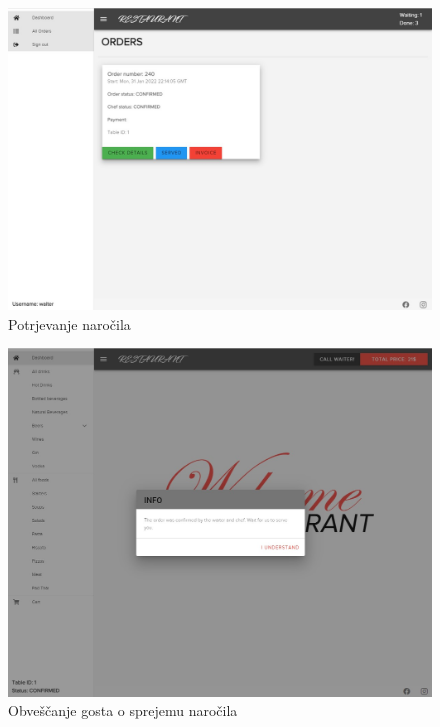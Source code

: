 \documentclass[a4paper, 12pt]{book}
\begin{document}
\begin{figure}
\centering
\includegraphics[width=11.5cm]{order_8.jpg}
\caption{Potrjevanje naročila}
\label{Opis5}
\end{figure}
\begin{figure}
\centering
\includegraphics[width=11.5cm]{order_9.jpg}
\caption{Obveščanje gosta o sprejemu naročila}
\label{Opis55}
\end{figure}
\end{document}
